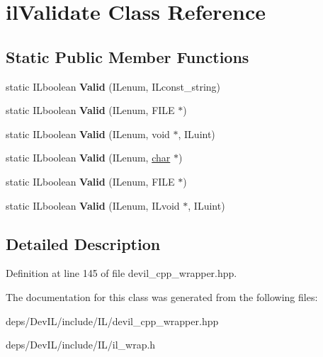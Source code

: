 \hypertarget{classilValidate}{}\section{il\+Validate Class Reference}
\label{classilValidate}
\subsection*{Static Public Member Functions}
\begin{DoxyCompactItemize}
\item 
\mbox{\label{classilValidate_a552a306e2483fef20cf4589b200545bd}} 
static I\+Lboolean {\bfseries Valid} (I\+Lenum, I\+Lconst\+\_\+string)
\item 
\mbox{\label{classilValidate_adeb2a4e1c89ef6f10fe8e850c7e78d32}} 
static I\+Lboolean {\bfseries Valid} (I\+Lenum, F\+I\+LE $\ast$)
\item 
\mbox{\label{classilValidate_ac8bdd81408301c714c83943ac555ab2b}} 
static I\+Lboolean {\bfseries Valid} (I\+Lenum, void $\ast$, I\+Luint)
\item 
\mbox{\label{classilValidate_a7a870c444e89b6dcbe05cf05a35f4911}} 
static I\+Lboolean {\bfseries Valid} (I\+Lenum, \hyperlink{classchar}{char} $\ast$)
\item 
\mbox{\label{classilValidate_ae3095a0f6efb478ac460725d44868145}} 
static I\+Lboolean {\bfseries Valid} (I\+Lenum, F\+I\+LE $\ast$)
\item 
\mbox{\label{classilValidate_a46b39f0121f6d2b49e2c552b1d820380}} 
static I\+Lboolean {\bfseries Valid} (I\+Lenum, I\+Lvoid $\ast$, I\+Luint)
\end{DoxyCompactItemize}


\subsection{Detailed Description}


Definition at line 145 of file devil\+\_\+cpp\+\_\+wrapper.\+hpp.



The documentation for this class was generated from the following files\+:\begin{DoxyCompactItemize}
\item 
deps/\+Dev\+I\+L/include/\+I\+L/devil\+\_\+cpp\+\_\+wrapper.\+hpp\item 
deps/\+Dev\+I\+L/include/\+I\+L/il\+\_\+wrap.\+h\end{DoxyCompactItemize}
